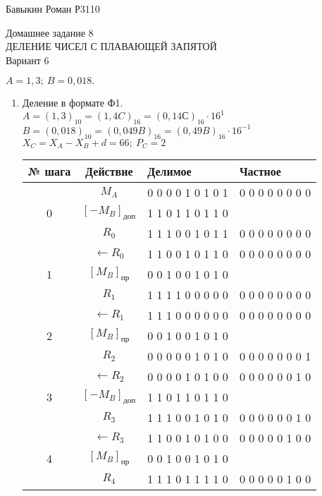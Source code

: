 \documentclass[a4paper, 12pt]{article}
\begin{document}
\begin{flushright}
  Бавыкин Роман Р3110
\end{flushright}

\begin{center}
  Домашнее задание 8\\
  ДЕЛЕНИЕ ЧИСЕЛ С ПЛАВАЮЩЕЙ ЗАПЯТОЙ\\
  Вариант 6
\end{center}
$A=1,3;\ B=0,018.$
\begin{enumerate}
  \item Деление в формате Ф1.\\
  $A=(1,3)_{10}=(1,4C)_{16}=(0,14С)_{16}\cdot16^1$\\
  $B=(0,018)_{10}=(0,049B)_{16}=(0,49B)_{16}\cdot16^{-1}$\\
  $X_C=X_A-X_B+d=66;\ P_C=2$\\
  \begin{tabular}{|c|c|l|l|}
  	\hline
  	№ шага & Действие         & Делимое           & Частное \\
  	\hline
  	& $M_A$                   & 0 0 0 0 1 0 1 0 1 & 0 0 0 0 0 0 0 0 \\
  	0 & $[-M_B]_{\mbox{доп}}$ & 1 1 0 1 1 0 1 1 0 & \\
  	& $R_0$                   & 1 1 1 0 0 1 0 1 1 & 0 0 0 0 0 0 0 0 \\
  	\hline
  	& $\leftarrow R_0$        & 1 1 0 0 1 0 1 1 0 & 0 0 0 0 0 0 0 0 \\
  	1 & $[M_B]_{\mbox{пр}}$   & 0 0 1 0 0 1 0 1 0 & \\
  	& $R_1$                   & 1 1 1 1 0 0 0 0 0 & 0 0 0 0 0 0 0 0 \\
  	\hline
  	& $\leftarrow R_1$        & 1 1 1 0 0 0 0 0 0 & 0 0 0 0 0 0 0 0 \\
  	2 & $[M_B]_{\mbox{пр}}$   & 0 0 1 0 0 1 0 1 0 & \\
  	& $R_2$                   & 0 0 0 0 0 1 0 1 0 & 0 0 0 0 0 0 0 1 \\
  	\hline
  	& $\leftarrow R_2$        & 0 0 0 0 1 0 1 0 0 & 0 0 0 0 0 0 1 0 \\
  	3 & $[-M_B]_{\mbox{доп}}$ & 1 1 0 1 1 0 1 1 0 & \\
  	& $R_3$                   & 1 1 1 0 0 1 0 1 0 & 0 0 0 0 0 0 1 0 \\
  	\hline
  	& $\leftarrow R_3$        & 1 1 0 0 1 0 1 0 0 & 0 0 0 0 0 1 0 0 \\
  	4 & $[M_B]_{\mbox{пр}}$   & 0 0 1 0 0 1 0 1 0 & \\
  	& $R_4$                   & 1 1 1 0 1 1 1 1 0 & 0 0 0 0 0 1 0 0 \\

\end{tabular}
\end{enumerate}
\end{document}
